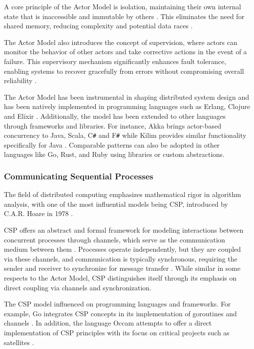 A core principle of the Actor Model is isolation, maintaining their own internal state that is inaccessible and immutable by others \cite{Koster2016}. This eliminates the need for shared memory, reducing complexity and potential data races \cite{Valkov2018}.

The Actor Model also introduces the concept of supervision, where actors can monitor the behavior of other actors and take corrective actions in the event of a failure. This supervisory mechanism significantly enhances fault tolerance, enabling systems to recover gracefully from errors without compromising overall reliability \cite{Trinder2017}.

The Actor Model has been instrumental in shaping distributed system design and has been natively implemented in programming languages such as Erlang, Clojure and Elixir \cite{Randtoul2022}. Additionally, the model has been extended to other languages through frameworks and libraries. For instance, Akka brings actor-based concurrency to Java, Scala, C\texttt{\#} and F\texttt{\#} while Kilim provides similar functionality specifically for Java \cite{Trinder2017}. Comparable patterns can also be adopted in other languages like Go, Rust, and Ruby using libraries or custom abstractions.

\subsubsection{Communicating Sequential Processes}

The field of distributed computing emphasizes mathematical rigor in algorithm analysis, with one of the most influential models being \gls{CSP}, introduced by C.A.R. Hoare in 1978 \cite{Hoare1978}.

\gls{CSP} offers an abstract and formal framework for modeling interactions between concurrent processes through channels, which serve as the communication medium between them \cite{Paduraru2018}. Processes operate independently, but they are coupled via these channels, and communication is typically synchronous, requiring the sender and receiver to synchronize for message transfer \cite{Hoare1978}. While similar in some respects to the Actor Model, \gls{CSP} distinguishes itself through its emphasis on direct coupling via channels and synchronization.

The \gls{CSP} model influenced on programming languages and frameworks. For example, Go integrates \gls{CSP} concepts in its implementation of goroutines and channels \cite{go-docs, Valkov2018,Paduraru2018}. In addition, the language Occam attempts to offer a direct implementation of \gls{CSP} principles with its focus on critical projects such as satellites \cite{Brolos2021}.

